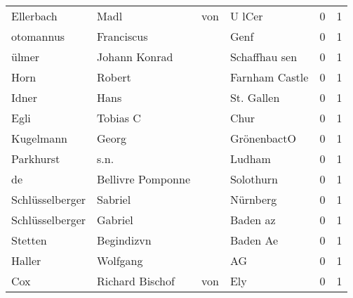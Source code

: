 \documentclass[10pt,a4paper,landscape]{article}
\begin{document}
\begin{longtable}{llllrr}
                Ellerbach &                               Madl &         von &                                      U lCer &          0 &         1 \\
                otomannus &                         Franciscus &             &                                        Genf &          0 &         1 \\
                    ülmer &                      Johann Konrad &             &                               Schaffhau sen &          0 &         1 \\
                     Horn &                             Robert &             &                              Farnham Castle &          0 &         1 \\
                    Idner &                               Hans &             &                                  St. Gallen &          0 &         1 \\
                     Egli &                           Tobias C &             &                                        Chur &          0 &         1 \\
                Kugelmann &                              Georg &             &                                 GrönenbactO &          0 &         1 \\
                Parkhurst &                               s.n. &             &                                      Ludham &          0 &         1 \\
                       de &                  Bellivre Pomponne &             &                                   Solothurn &          0 &         1 \\
          Schlüsselberger &                            Sabriel &             &                                    Nürnberg &          0 &         1 \\
          Schlüsselberger &                            Gabriel &             &                                    Baden az &          0 &         1 \\
                  Stetten &                         Begindizvn &             &                                    Baden Ae &          0 &         1 \\
                   Haller &                           Wolfgang &             &                                          AG &          0 &         1 \\
                      Cox &                    Richard Bischof &         von &                                         Ely &          0 &         1 \\

\end{longtable}
\end{document}
